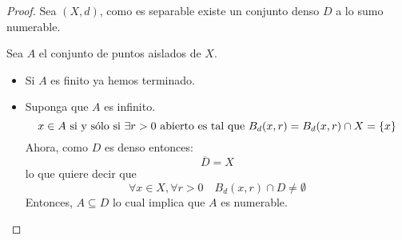 \documentclass[12pt]{report}
\newcounter{it}
\theoremstyle{largebreak}
\begin{document}
    \begin{proof}
        Sea $(X,d)$, como es separable existe un conjunto denso $D$ a lo sumo numerable.

        Sea $A$ el conjunto de puntos aislados de $X$.
        \begin{itemize}
            \item Si $A$ es finito ya hemos terminado.
            \item Suponga que $A$ es infinito.
            \begin{equation*}
                x\in A\textup{ si y sólo si }\exists r>0\textup{ abierto es tal que }B_d(x,r)=B_d(x,r)\cap X=\left\{ x\right\}
            \end{equation*}
            Ahora, como $D$ es denso entonces:
            \begin{equation*}
                \overline{D}=X
            \end{equation*}
            lo que quiere decir que
            \begin{equation*}
                \forall x\in X,\forall r>0\quad B_d(x,r)\cap D\neq\emptyset
            \end{equation*}
            Entonces, $A\subseteq D$ lo cual implica que $A$ es numerable.
        \end{itemize}
    \end{proof}
\end{document}
